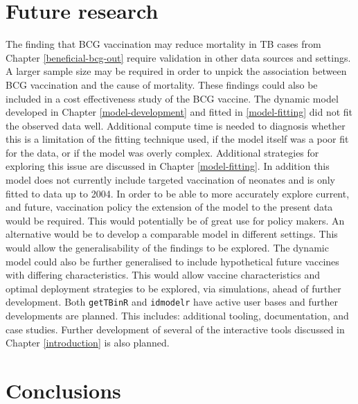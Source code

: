 \documentclass[11pt,twoside]{bristolthesis}
\begin{document}
  \hypertarget{future-research}{%
  \section{Future research}\label{future-research}}
  
  The finding that BCG vaccination may reduce mortality in TB cases from Chapter \ref{beneficial-bcg-out} require validation in other data sources and settings. A larger sample size may be required in order to unpick the association between BCG vaccination and the cause of mortality. These findings could also be included in a cost effectiveness study of the BCG vaccine. The dynamic model developed in Chapter \ref{model-development} and fitted in \ref{model-fitting} did not fit the observed data well. Additional compute time is needed to diagnosis whether this is a limitation of the fitting technique used, if the model itself was a poor fit for the data, or if the model was overly complex. Additional strategies for exploring this issue are discussed in Chapter \ref{model-fitting}. In addition this model does not currently include targeted vaccination of neonates and is only fitted to data up to 2004. In order to be able to more accurately explore current, and future, vaccination policy the extension of the model to the present data would be required. This would potentially be of great use for policy makers. An alternative would be to develop a comparable model in different settings. This would allow the generalisability of the findings to be explored. The dynamic model could also be further generalised to include hypothetical future vaccines with differing characteristics. This would allow vaccine characteristics and optimal deployment strategies to be explored, via simulations, ahead of further development. Both \texttt{getTBinR} and \texttt{idmodelr} have active user bases and further developments are planned. This includes: additional tooling, documentation, and case studies. Further development of several of the interactive tools discussed in Chapter \ref{introduction} is also planned.
  
  \hypertarget{conclusions}{%
  \section{Conclusions}\label{conclusions}}
  
\end{document}
